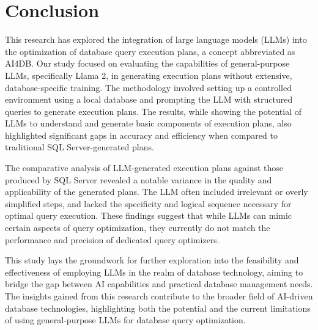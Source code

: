 \section{Conclusion}

This research has explored the integration of large language models (LLMs) into the optimization of database query execution plans, a concept abbreviated as AI4DB. Our study focused on evaluating the capabilities of general-purpose LLMs, specifically Llama 2, in generating execution plans without extensive, database-specific training. The methodology involved setting up a controlled environment using a local database and prompting the LLM with structured queries to generate execution plans. The results, while showing the potential of LLMs to understand and generate basic components of execution plans, also highlighted significant gaps in accuracy and efficiency when compared to traditional SQL Server-generated plans.

The comparative analysis of LLM-generated execution plans against those produced by SQL Server revealed a notable variance in the quality and applicability of the generated plans. The LLM often included irrelevant or overly simplified steps, and lacked the specificity and logical sequence necessary for optimal query execution. These findings suggest that while LLMs can mimic certain aspects of query optimization, they currently do not match the performance and precision of dedicated query optimizers.

This study lays the groundwork for further exploration into the feasibility and effectiveness of employing LLMs in the realm of database technology, aiming to bridge the gap between AI capabilities and practical database management needs. The insights gained from this research contribute to the broader field of AI-driven database technologies, highlighting both the potential and the current limitations of using general-purpose LLMs for database query optimization.